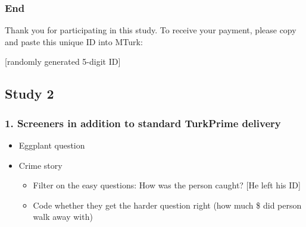 \subsubsection*{End}

Thank you for participating in this study. To receive your payment, please copy
and paste this unique ID into MTurk: 

[randomly generated 5-digit ID]


\subsection{Study 2}

\subsubsection*{1. Screeners in addition to standard TurkPrime delivery}
\begin{itemize}
    \item Eggplant question
    \item Crime story
    \begin{itemize}
        \item Filter on the easy questions: How was the person caught? [He left his ID]
        \item Code whether they get the harder question right (how much \$ did person walk away with)
    \end{itemize}
\end{itemize}


